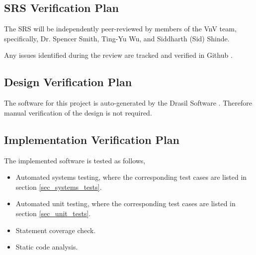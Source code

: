 \documentclass[12pt, titlepage]{article}
\begin{document}
\subsection{SRS Verification Plan}

  
The SRS will be independently peer-reviewed by members of the VnV team, specifically,
Dr. Spencer Smith, Ting-Yu Wu, and Siddharth (Sid) Shinde.
 
Any issues identified during the review are tracked and verified in Github \cite{Github}.
 
\subsection{Design Verification Plan}


The software for this project is auto-generated by the Drasil Software \cite{Drasil}. Therefore
manual verification of the design is not required.

\subsection{Implementation Verification Plan}

  
The implemented software is tested as follows,

\begin{itemize}
\item Automated systems testing, where the corresponding test cases
are listed in section \ref{sec_systems_tests}. 
\item Automated unit testing, where the corresponding test cases are
listed in section \ref{sec_unit_tests}. 
\item Statement coverage check. 
\item Static code analysis.
\end{itemize}

\end{document}
